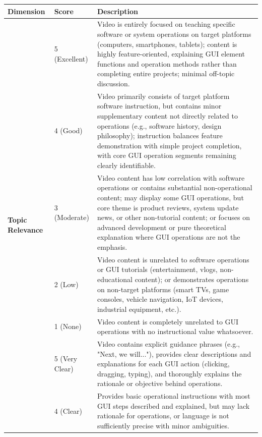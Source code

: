 \documentclass{llmxive}
\begin{document}
\begin{table}[htbp]
\centering
\begin{tabular}{llp{10cm}} %
\toprule
\textbf{Dimension} & \textbf{Score} & \textbf{Description} \\ %
\midrule
\multirow{10}{*}{\textbf{Topic Relevance}} %
& 5 (Excellent) & Video is entirely focused on teaching specific software or system operations on target platforms (computers, smartphones, tablets); content is highly feature-oriented, explaining GUI element functions and operation methods rather than completing entire projects; minimal off-topic discussion. \\
\cmidrule{2-3}
& 4 (Good) & Video primarily consists of target platform software instruction, but contains minor supplementary content not directly related to operations (e.g., software history, design philosophy); instruction balances feature demonstration with simple project completion, with core GUI operation segments remaining clearly identifiable. \\
\cmidrule{2-3}
& 3 (Moderate) & Video content has low correlation with software operations or contains substantial non-operational content; may display some GUI operations, but core theme is product reviews, system update news, or other non-tutorial content; or focuses on advanced development or pure theoretical explanation where GUI operations are not the emphasis. \\
\cmidrule{2-3}
& 2 (Low) & Video content is unrelated to software operations or GUI tutorials (entertainment, vlogs, non-educational content); or demonstrates operations on non-target platforms (smart TVs, game consoles, vehicle navigation, IoT devices, industrial equipment, etc.). \\
\cmidrule{2-3}
& 1 (None) & Video content is completely unrelated to GUI operations with no instructional value whatsoever. \\
\midrule
\multirow{10}{*}{\textbf{Instruction Clarity}}
& 5 (Very Clear) & Video contains explicit guidance phrases (e.g., "Next, we will..."), provides clear descriptions and explanations for each GUI action (clicking, dragging, typing), and thoroughly explains the rationale or objective behind operations. \\
\cmidrule{2-3}
& 4 (Clear) & Provides basic operational instructions with most GUI steps described and explained, but may lack rationale for operations, or language is not sufficiently precise with minor ambiguities. \\

\end{tabular}
\end{table}
\end{document}
